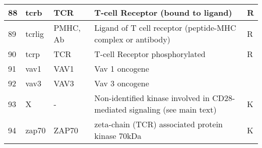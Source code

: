 \documentclass[a4paper, 12pt,epsfig, onecolumn]{article}
\begin{document}
{\begin{longtable}{|p{}|p{}|p{}|p{}|p{}|}
\hline
        88 &       tcrb &       TCR  & T-cell Receptor (bound to ligand) &         R  \\
\hline
        89 &     tcrlig &   PMHC, Ab & Ligand of T cell receptor (peptide-MHC complex or antibody) &         R  \\
\hline
        90 &      tcrp  &        TCR & T-cell Receptor phosphorylated &         R  \\
\hline
        91 &       vav1 &       VAV1 & Vav 1 oncogene &            \\
\hline
        92 &       vav3 &       VAV3 & Vav 3 oncogene &            \\
\hline
        93 &          X &          - & Non-identified kinase involved in CD28-mediated signaling (see main text) &          K \\
\hline
        94 &     zap70  &      ZAP70 & zeta-chain (TCR) associated protein kinase 70kDa  &          K \\
\hline
\end{longtable}  

}
\renewcommand{\familydefault}{\rmdefault} 

\newpage
%
%
%
\end{document}
